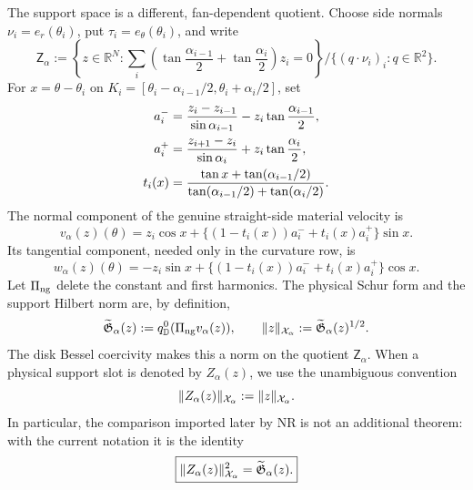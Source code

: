 The support space is a different, fan-dependent quotient.  Choose side
normals $\nu_i=e_r(\theta_i)$, put $\tau_i=e_\theta(\theta_i)$, and write
\begin{equation}\label{CT:eq:support-area-row}
 \mathsf Z_\alpha
 :=\left\{z\in\mathbb R^N:
 \sum_i\left(\tan\frac{\alpha_{i-1}}2+
              \tan\frac{\alpha_i}2\right)z_i=0\right\}
 \big/\{(q\cdot\nu_i)_i:q\in\mathbb R^2\}.
\end{equation}
For $x=\theta-\theta_i$ on
$K_i=[\theta_i-\alpha_{i-1}/2,\theta_i+\alpha_i/2]$, set
\begin{align}
 a_i^-&=\frac{z_i-z_{i-1}}{\sin\alpha_{i-1}}
          -z_i\tan\frac{\alpha_{i-1}}2,\notag\\
 a_i^+&=\frac{z_{i+1}-z_i}{\sin\alpha_i}
          +z_i\tan\frac{\alpha_i}2,\label{CT:eq:support-endpoint-jets}\\
 t_i(x)&=\frac{\tan x+\tan(\alpha_{i-1}/2)}
 {\tan(\alpha_{i-1}/2)+\tan(\alpha_i/2)}.\notag
\end{align}
The normal component of the genuine straight-side material velocity is
\begin{equation}\label{CT:eq:physical-normal-trace}
 v_\alpha(z)(\theta)
 =z_i\cos x+\bigl\{(1-t_i(x))a_i^-+t_i(x)a_i^+\bigr\}\sin x.
\end{equation}
Its tangential component, needed only in the curvature row, is
\begin{equation}\label{CT:eq:physical-tangential-trace}
 w_\alpha(z)(\theta)
 =-z_i\sin x+\bigl\{(1-t_i(x))a_i^-+t_i(x)a_i^+\bigr\}\cos x.
\end{equation}
Let $\Pi_{\rm ng}$ delete the constant and first harmonics.  The physical Schur
form and the support Hilbert norm are, by definition,
\begin{equation}\label{CT:eq:Xalpha-definition}
 \widetilde{\mathfrak G}_\alpha(z)
 :=q_{\mathbb D}^{0}(\Pi_{\rm ng} v_\alpha(z)),
 \qquad
 \|z\|_{\mathcal X_\alpha}:=\widetilde{\mathfrak G}_\alpha(z)^{1/2}.
\end{equation}
The disk Bessel coercivity makes this a norm on the quotient
$\mathsf Z_\alpha$.  When a physical support slot is denoted by
$Z_\alpha(z)$, we use the unambiguous convention
\begin{equation}\label{CT:eq:support-X-convention}
 \|Z_\alpha(z)\|_{\mathcal X_\alpha}:=\|z\|_{\mathcal X_\alpha}.
\end{equation}
In particular, the comparison imported later by NR is not an additional
theorem: with the current notation it is the identity
\begin{equation}\label{CT:eq:exact-norm-interface}
 \boxed{\|Z_\alpha(z)\|_{\mathcal X_\alpha}^2
        =\widetilde{\mathfrak G}_\alpha(z).}
\end{equation}

